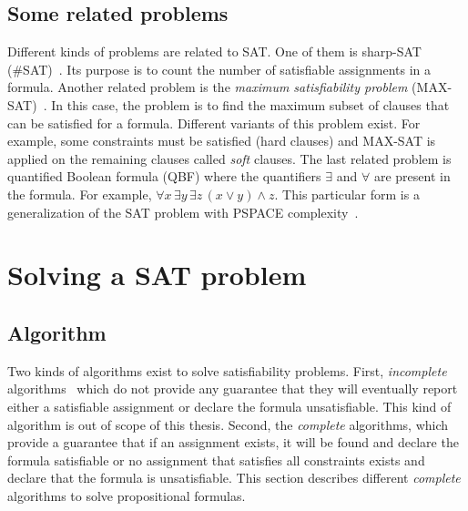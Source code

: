 \subsection{Some related problems}
Different kinds of problems are related to SAT.
One of them is sharp-SAT (\#SAT)~\cite{valiant1979complexity}. Its purpose is to count the number of satisfiable assignments in a formula.
Another related problem is the \textit{maximum satisfiability problem} (MAX-SAT)~\cite{biere2009handbook}. In this case, the problem
is to find the maximum subset of clauses that can be satisfied for a formula. Different variants
of this problem exist. For example, some constraints must be satisfied (hard clauses) and MAX-SAT
is applied on the remaining clauses called \emph{soft} clauses.
The last related problem is quantified Boolean formula (QBF) where the quantifiers $\exists$ and
$\forall$ are present in the formula. For example, $\forall x\, \exists y\, \exists z \, (x \lor y) \land z$.
This particular form is a generalization of the SAT problem with PSPACE complexity~\cite{garey2002computers}.


\section{Solving a SAT problem}

\subsection{Algorithm}

Two kinds of algorithms exist to solve satisfiability problems.
First, \emph{incomplete} algorithms~\cite{kautz2009incomplete} which do not provide any guarantee that they will eventually report
either a satisfiable assignment or declare the formula unsatisfiable. This kind of algorithm is out of scope of this thesis. 
Second, the \emph{complete} algorithms, which provide a guarantee that if an assignment exists,
it will be found and declare the formula satisfiable or no assignment that satisfies all constraints exists and declare that the formula is unsatisfiable.
This section describes different \emph{complete} algorithms to solve propositional formulas.

